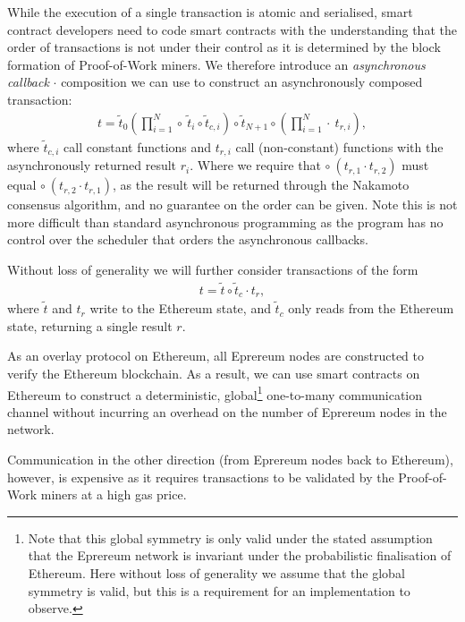 \documentclass[twocolumn]{article}
\begin{document}
While the execution of a single transaction is atomic and serialised, smart contract developers need to code smart contracts with the understanding that the order of transactions is not under their control as it is determined by the block formation of Proof-of-Work miners.  We therefore introduce an \textit{asynchronous callback} $\cdot$ composition we can use to construct an asynchronously composed transaction:
\begin{align} \label{GeneralTransaction}
	t = \tilde{t}_0 \left(\prod_{i=1}^{N} \circ \ \tilde{t}_i \circ \tilde{t}_{c, i} \right) \circ \tilde{t}_{N+1} \circ \left(\prod_{i=1}^N \cdot \ t_{r, i}\right),
\end{align}
where $\tilde{t}_{c, i}$ call constant functions and $t_{r, i}$ call (non-constant) functions with the asynchronously returned result $r_i$.  Where we require that $\circ \ ( t_{r, 1} \cdot t_{r, 2} )$ must equal $\circ \ ( t_{r, 2} \cdot t_{r, 1} )$, as the result will be returned through the Nakamoto consensus algorithm, and no guarantee on the order can be given.  Note this is not more difficult than standard asynchronous programming as the program has no control over the scheduler that orders the asynchronous callbacks.

Without loss of generality we will further consider transactions of the form
\begin{align} \label{BasicTransaction}
	t = \tilde{t} \circ \tilde{t}_c \cdot t_r,
\end{align}
where $\tilde{t}$ and $t_r$ write to the Ethereum state, and $\tilde{t}_c$ only reads from the Ethereum state, returning a single result $r$.

As an overlay protocol on Ethereum, all Eprereum nodes are constructed to verify the Ethereum blockchain.  As a result, we can use smart contracts on Ethereum to construct a deterministic, global\footnote{Note that this global symmetry is only valid under the stated assumption that the Eprereum network is invariant under the probabilistic finalisation of Ethereum.  Here without loss of generality we assume that the global symmetry is valid, but this is a requirement for an implementation to observe.} one-to-many communication channel without incurring an overhead on the number of Eprereum nodes in the network.

Communication in the other direction (from Eprereum nodes back to Ethereum), however, is expensive as it requires transactions to be validated by the Proof-of-Work miners at a high gas price.
\end{document}

